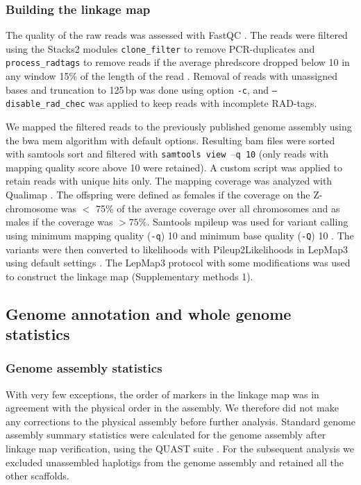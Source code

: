 \documentclass[twocolumn]{bmcart}%
\begin{document}
\subsubsection*{Building the linkage map} 
The quality of the raw reads was assessed with FastQC \cite{babrahambioinformaticsFastQCQualityControl2010}. The reads were filtered using the Stacks2 modules \texttt{clone\_filter} to remove PCR-duplicates and \texttt{process\_radtags} to remove reads if the average phredscore dropped below 10 in any window 15\% of the length of the read \cite{catchenStacksAnalysisTool2013}. Removal of reads with unassigned bases and truncation to 125\,bp was done using option \texttt{-c}, and \texttt{--disable\_rad\_chec} was applied to keep reads with incomplete RAD-tags. 

We mapped the filtered reads to the previously published genome assembly \cite{lohse_genome_2021} using the bwa mem algorithm \cite{liAligningSequenceReads2013} with default options.  Resulting bam files were sorted with samtools sort \cite{liSequenceAlignmentMap2009} and filtered with \texttt{samtools view $–$q 10} (only reads with mapping quality score above 10 were retained). A custom script was applied to retain reads with unique hits only. The mapping coverage was analyzed with Qualimap \cite{okonechnikovQualimapAdvancedMultisample2015}. The offspring were defined as females if the coverage on the Z-chromosome was $<$ 75\% of the average coverage over all chromosomes and as males if the coverage was $>75\%$. Samtools mpileup was used for variant calling using minimum mapping quality (\texttt{-q}) 10 and minimum base quality (\texttt{-Q}) 10 \cite{liSequenceAlignmentMap2009}. The variants were then converted to likelihoods with Pileup2Likelihoods in LepMap3 using default settings \cite{rastasLepMAP3RobustLinkage2017}. The LepMap3 protocol \cite{rastasLepMAP3RobustLinkage2017} with some modifications was used to construct the linkage map (Supplementary methods 1). 

\subsection*{Genome annotation and whole genome statistics}
\subsubsection*{Genome assembly statistics}
With very few exceptions, the order of markers in the linkage map was in agreement with the physical order in the assembly. We therefore did not make any corrections to the physical assembly before further analysis. Standard genome assembly summary statistics were calculated for the genome assembly after linkage map verification, using the QUAST suite \cite{gurevichQUASTQualityAssessment2013}. For the subsequent analysis we excluded unassembled haplotigs from the genome assembly and retained all the other scaffolds. 
\end{document}
